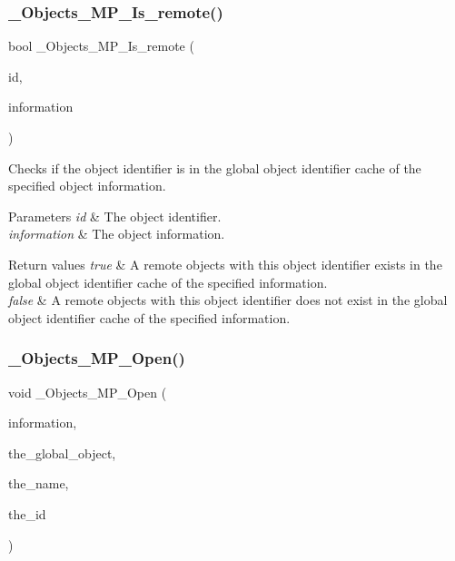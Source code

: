 \subsubsection{\texorpdfstring{\_Objects\_MP\_Is\_remote()}{\_Objects\_MP\_Is\_remote()}}
{\footnotesize\ttfamily bool \+\_\+\+Objects\+\_\+\+M\+P\+\_\+\+Is\+\_\+remote (\begin{DoxyParamCaption}\item[{\mbox{\hyperlink{group__RTEMSScoreObject_ga5821f52a51072941bdd603e542d0863e}{Objects\+\_\+\+Id}}}]{id,  }\item[{const \mbox{\hyperlink{structObjects__Information}{Objects\+\_\+\+Information}} $\ast$}]{information }\end{DoxyParamCaption})}



Checks if the object identifier is in the global object identifier cache of the specified object information. 


\begin{DoxyParams}{Parameters}
{\em id} & The object identifier. \\
\hline
{\em information} & The object information.\\
\hline
\end{DoxyParams}

\begin{DoxyRetVals}{Return values}
{\em true} & A remote objects with this object identifier exists in the global object identifier cache of the specified information. \\
\hline
{\em false} & A remote objects with this object identifier does not exist in the global object identifier cache of the specified information. \\
\hline
\end{DoxyRetVals}
\mbox{\label{group__RTEMSScoreObjectMP_gaa5c13d3459c22165867d079319392ee6}} 
\subsubsection{\texorpdfstring{\_Objects\_MP\_Open()}{\_Objects\_MP\_Open()}}
{\footnotesize\ttfamily void \+\_\+\+Objects\+\_\+\+M\+P\+\_\+\+Open (\begin{DoxyParamCaption}\item[{\mbox{\hyperlink{structObjects__Information}{Objects\+\_\+\+Information}} $\ast$}]{information,  }\item[{Objects\+\_\+\+M\+P\+\_\+\+Control $\ast$}]{the\+\_\+global\+\_\+object,  }\item[{uint32\+\_\+t}]{the\+\_\+name,  }\item[{\mbox{\hyperlink{group__RTEMSScoreObject_ga5821f52a51072941bdd603e542d0863e}{Objects\+\_\+\+Id}}}]{the\+\_\+id }\end{DoxyParamCaption})}



